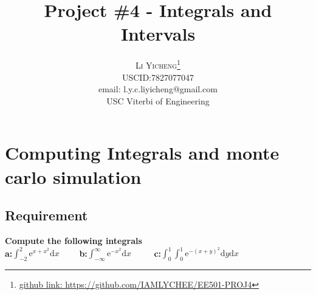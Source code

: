 \documentclass[twoside]{article}
\title{\vspace{-15mm}\fontsize{24pt}{10pt}\selectfont\textbf{Project \#4 - Integrals and Intervals }} %
\author{
\large
\textsc{Li Yicheng}\thanks{\href{https://github.com/IAMLYCHEE/EE501-PROJ4}{github link: https://github.com/IAMLYCHEE/EE501-PROJ4} }\\[2mm] %
\normalsize USCID:7827077047\\
\normalsize email: l.y.c.liyicheng@gmail.com \\ %
\normalsize USC Viterbi of Engineering
\vspace{-5mm}
}
\date{}
\begin{document}
\maketitle %

\thispagestyle{fancy} %
\section{Computing Integrals and monte carlo simulation}
\subsection{\normalsize{Requirement}}
\noindent \textbf {Compute the following integrals}\\
\noindent \textbf {a:}$\int_{-2}^{2}\mathrm{e}^{x+x^2}\mathrm{d}x$
~~~~\textbf {b:}$\int_{-\infty}^\infty\mathrm{e}^{-x^2}\mathrm{d}x$
~~~~ \textbf {c:}$\int_0^1\int_0^1\mathrm{e}^{-(x+y)^2}\mathrm{d}y\mathrm{d}x$\\
\end{document}
